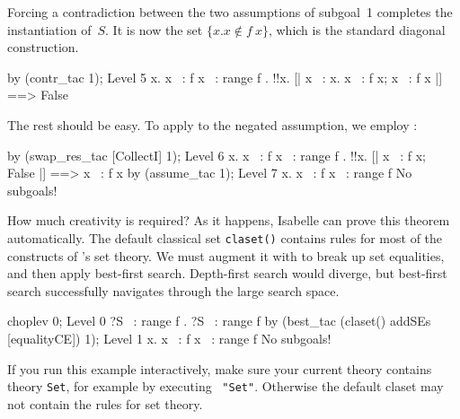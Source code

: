 Forcing a contradiction between the two assumptions of subgoal~1
completes the instantiation of~$S$.  It is now the set $\{x. x\not\in
f~x\}$, which is the standard diagonal construction.
\begin{ttbox}
by (contr_tac 1);
{\out Level 5}
{\out {\ttlbrace}x. x ~: f x{\ttrbrace} ~: range f}
{. !!x. [| x ~: {\ttlbrace}x. x ~: f x{\ttrbrace}; x ~: f x |] ==> False}
\end{ttbox}
The rest should be easy.  To apply  to the negated
assumption, we employ :
\begin{ttbox}
by (swap_res_tac [CollectI] 1);
{\out Level 6}
{\out {\ttlbrace}x. x ~: f x{\ttrbrace} ~: range f}
{. !!x. [| x ~: f x; ~ False |] ==> x ~: f x}
\ttbreak
by (assume_tac 1);
{\out Level 7}
{\out {\ttlbrace}x. x ~: f x{\ttrbrace} ~: range f}
{\out No subgoals!}
\end{ttbox}
How much creativity is required?  As it happens, Isabelle can prove this
theorem automatically.  The default classical set {\tt claset()} contains rules
for most of the constructs of \HOL's set theory.  We must augment it with
 to break up set equalities, and then apply best-first
search.  Depth-first search would diverge, but best-first search
successfully navigates through the large search space.
\begin{ttbox}
choplev 0;
{\out Level 0}
{\out ?S ~: range f}
{. ?S ~: range f}
\ttbreak
by (best_tac (claset() addSEs [equalityCE]) 1);
{\out Level 1}
{\out {\ttlbrace}x. x ~: f x{\ttrbrace} ~: range f}
{\out No subgoals!}
\end{ttbox}
If you run this example interactively, make sure your current theory contains
theory \texttt{Set}, for example by executing
~{\tt"Set"}.  Otherwise the default claset may not
contain the rules for set theory.

